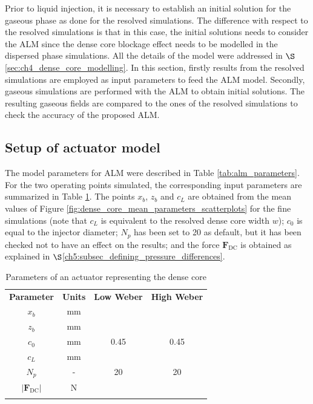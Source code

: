 Prior to liquid injection, it is necessary to establish an initial solution for the gaseous phase as done for the resolved simulations. The difference with respect to the resolved simulations is that in this case, the initial solutions needs to consider the ALM since the dense core blockage effect needs to be modelled in the dispersed phase simulations. All the details of the model were addressed in $\S$\ref{sec:ch4_dense_core_modelling}. In this section, firstly results from the resolved simulations are employed as input parameters to feed the ALM model. Secondly, gaseous simulations are performed with the ALM to obtain initial solutions. The resulting gaseous fields are compared to the ones of the resolved simulations to check the accuracy of the proposed ALM.

\subsection{Setup of actuator model}

The model parameters for ALM were described in Table \ref{tab:alm_parameters}. For the two operating points simulated, the corresponding input parameters are summarized in Table \ref{tab:jicf_lgs_ALM_parameters}. The points $x_b$, $z_b$ and $c_L$ are obtained from the mean values of Figure \ref{fig:dense_core_mean_parameters_scatterplots} for the fine simulations (note that $c_L$ is equivalent to the resolved dense core width $w$); $c_0$ is equal to the injector diameter; $N_p$ has been set to 20 as default, but it has been checked not to have an effect on the results; and the force $\textbf{F}_\mathrm{DC}$ is obtained as explained in $\S$\ref{ch5:subsec_defining_pressure_differences}.

\begin{table}[!h]
\centering
\caption{Parameters of an actuator representing the dense core}
\begin{tabular}{cccc}
\thickhline
\textbf{Parameter} & \textbf{Units} & \textbf{Low Weber} &  \textbf{High Weber} \\
\thickhline
$x_b$ & mm & & \\
$z_b$ & mm & & \\
$c_0$ & mm & 0.45 & 0.45 \\
$c_L$ & mm & & \\
$N_p$ & - & 20 & 20 \\
$| \textbf{F}_\mathrm{DC} |$ & N &  & \\
\thickhline
\end{tabular}
\label{tab:jicf_lgs_ALM_parameters}
\end{table}

